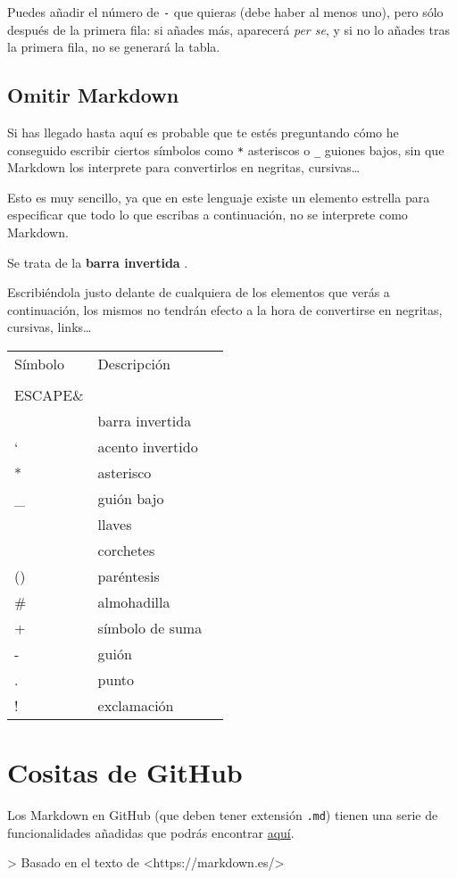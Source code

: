 Puedes añadir el número de \lstinline{-} que quieras (debe haber al menos uno), pero sólo después de la primera fila: si añades más, aparecerá \emph{per se}, y si no lo añades tras la primera fila, no se generará la tabla.

\section{Omitir Markdown}

Si has llegado hasta aquí es probable que te estés preguntando cómo he conseguido escribir ciertos símbolos como \lstinline{*} asteriscos o \lstinline{_} guiones bajos, sin que Markdown los interprete para convertirlos en negritas, cursivas…

Esto es muy sencillo, ya que en este lenguaje existe un elemento estrella para especificar que todo lo que escribas a continuación, no se interprete como Markdown.

Se trata de la \textbf{barra invertida} \lstinline{}.

Escribiéndola justo delante de cualquiera de los elementos que verás a continuación, los mismos no tendrán efecto a la hora de convertirse en negritas, cursivas, links…

\begin{table}[]
\begin{tabular}{lll}
 Símbolo & Descripción \\              
 \\ESCAPE\&\\ & barra invertida \\
 ` & acento invertido \\
 * & asterisco \\
 _ & guión bajo \\
 {} & llaves \\
 [] & corchetes \\
 () & paréntesis \\
 # & almohadilla \\
 + & símbolo de suma \\
 - & guión \\
 . & punto \\
 ! & exclamación \\
\end{tabular}
\end{table}

\chapter{Cositas de GitHub}

Los Markdown en GitHub (que deben tener extensión \lstinline{.md}) tienen una serie de funcionalidades añadidas que podrás encontrar \href{https://guides.github.com/features/mastering-markdown/}{aquí}.

> Basado en el texto de <https://markdown.es/>